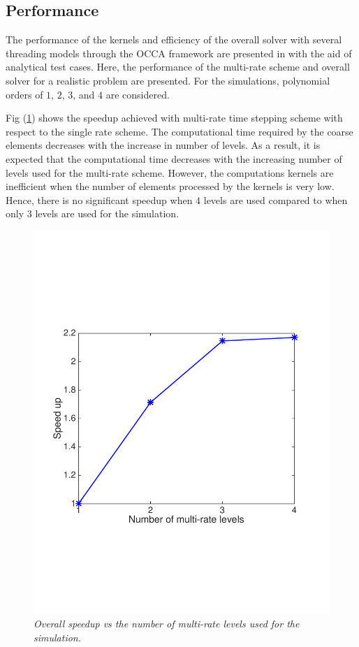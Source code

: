 \subsection{Performance}
The performance of the kernels and efficiency of the overall solver with several threading models through the OCCA framework are presented in \cite{gandham2014swe} with the aid of analytical test cases. Here, the performance of the multi-rate scheme and overall solver for a realistic problem are presented. For the simulations, polynomial orders of $1$, $2$, $3$, and $4$ are considered.

Fig (\ref{fig:timeVsLevels}) shows the speedup achieved with multi-rate time stepping scheme with respect to the single rate scheme. The computational time required by the coarse elements decreases with the increase in number of levels. As a result, it is expected that the computational time decreases with the increasing number of levels used for the multi-rate scheme. However, the computations kernels are inefficient when the number of elements processed by the kernels is very low. Hence, there is no significant speedup when $4$ levels are used compared to when only $3$ levels are used for the simulation.  
\begin{figure}[h!]
\begin{center}
\includegraphics[trim=1cm 6cm 2cm 7cm,clip=true,width=0.5\linewidth]{./figures/timeVsLevels.pdf}
\caption{\emph{Overall speedup vs the number of multi-rate levels used for the simulation.}}
\label{fig:timeVsLevels}
\end{center}
\end{figure}

